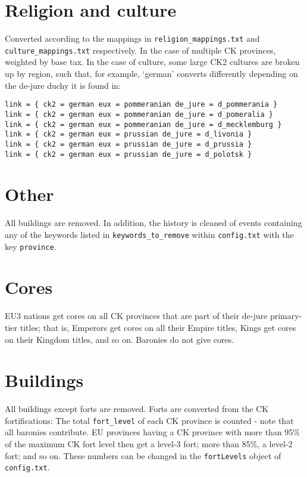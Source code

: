 \documentclass[12pt,ebook,oneside]{book}
\begin{document}
\section{Religion and culture}

\label{sec:provculture}

Converted according to the mappings in \verb|religion_mappings.txt|
and \verb|culture_mappings.txt| respectively. In the case of multiple
CK provinces, weighted by base tax. In the case of culture, some large
CK2 cultures are broken up by region, such that, for example, `german'
converts differently depending on the de-jure duchy it is found in:
\begin{verbatim}
link = { ck2 = german eux = pommeranian de_jure = d_pommerania }
link = { ck2 = german eux = pommeranian de_jure = d_pomeralia }
link = { ck2 = german eux = pommeranian de_jure = d_mecklemburg }
link = { ck2 = german eux = prussian de_jure = d_livonia }
link = { ck2 = german eux = prussian de_jure = d_prussia }
link = { ck2 = german eux = prussian de_jure = d_polotsk }
\end{verbatim} 

\section{Other}

All buildings are removed. In addition, the history is cleaned of
events containing any of the keywords listed in
\verb|keywords_to_remove|
within \verb|config.txt| with the key \verb|province|. 

\section{Cores}

EU3 nations get cores on all CK provinces that are part of their
de-jure primary-tier titles; that is, Emperors get cores on all their
Empire titles, Kings get cores on their Kingdom titles, and so
on. Baronies do not give cores. 

\section{Buildings}

All buildings except forts are removed. Forts are converted from the
CK fortifications: The total \verb|fort_level| of each CK province is
counted - note that all baronies contribute. EU provinces having a CK
province with more than 95\% of the maximum CK fort level then get a
level-3 fort; more than 85\%, a level-2 fort; and so on. These numbers
can be changed in the \verb|fortLevels| object of \verb|config.txt|. 
\end{document}

